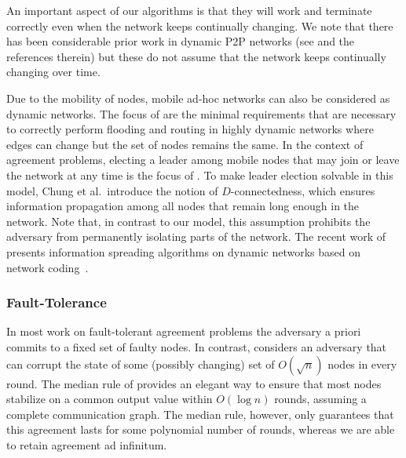 \documentclass[leqno,11pt]{article}
\begin{document}
An important aspect of our algorithms  is that they will work and terminate correctly even when the
  network keeps continually changing.  We note that there has been
considerable prior work in dynamic P2P networks (see \cite{PRU01} and the references therein) but these do not assume that
the network keeps continually changing over time.







Due to the mobility of nodes, mobile ad-hoc networks can also be considered as
dynamic networks. The focus of \cite{OW05} are the minimal requirements
that are necessary to correctly perform flooding and routing in highly dynamic
networks where edges can change but the set of nodes remains the same. In the
context of agreement problems, electing a leader among mobile nodes that may
join or leave the network at any time is the focus of \cite{CRW11}. To make
leader election solvable in this model, Chung et al.\ introduce the notion of
$D$-connectedness, which ensures information propagation among all nodes that
remain long enough in the network. Note that, in contrast to our model, this
assumption prohibits the adversary from permanently isolating parts of the
network. The recent work of~\cite{haeupler+k:dynamic} presents
information spreading algorithms on dynamic networks based on network
coding~\cite{ahlswede+cly:coding}. 

\subsubsection{Fault-Tolerance}

In most work on fault-tolerant agreement problems 
the adversary a priori commits to a fixed set of faulty nodes.
In contrast, \cite{DGMSS11} considers an adversary that can corrupt the
state of some (possibly changing) set of $O(\sqrt{n})$ nodes in every round.
The median rule of \cite{DGMSS11} provides an elegant way to ensure that
most nodes stabilize on a common output value within $O(\log n)$ rounds,
assuming a complete communication graph. The median rule, however, only
guarantees that this agreement lasts for some polynomial number of rounds,
whereas we are able to retain agreement ad infinitum.
\end{document}
